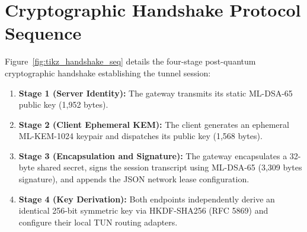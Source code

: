 \section{Cryptographic Handshake Protocol Sequence}
\label{sec:handshake_sequence}

Figure~\ref{fig:tikz_handshake_seq} details the four-stage post-quantum cryptographic handshake establishing the tunnel session:
\begin{enumerate}
    \item \textbf{Stage 1 (Server Identity):} The gateway transmits its static ML-DSA-65 public key (1,952 bytes).
    \item \textbf{Stage 2 (Client Ephemeral KEM):} The client generates an ephemeral ML-KEM-1024 keypair and dispatches its public key (1,568 bytes).
    \item \textbf{Stage 3 (Encapsulation and Signature):} The gateway encapsulates a 32-byte shared secret, signs the session transcript using ML-DSA-65 (3,309 bytes signature), and appends the JSON network lease configuration.
    \item \textbf{Stage 4 (Key Derivation):} Both endpoints independently derive an identical 256-bit symmetric key via HKDF-SHA256 (RFC 5869) and configure their local TUN routing adapters.
\end{enumerate}

